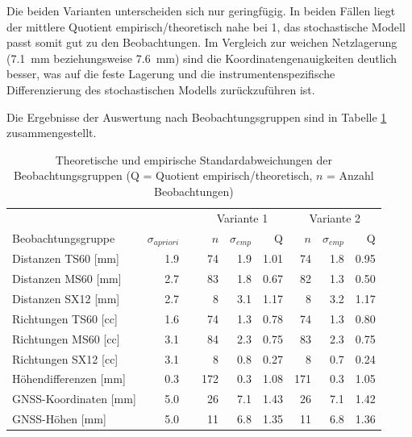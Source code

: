 Die beiden Varianten unterscheiden sich nur geringfügig. In beiden Fällen liegt der mittlere
Quotient empirisch/theoretisch nahe bei 1, das stochastische Modell passt somit gut zu den
Beobachtungen. Im Vergleich zur weichen Netzlagerung
(7.1~mm beziehungsweise 7.6~mm) sind die Koordinatengenauigkeiten deutlich besser, was auf die
feste Lagerung und die instrumentenspezifische Differenzierung des stochastischen Modells
zurückzuführen ist.\bigskip

Die Ergebnisse der Auswertung nach Beobachtungsgruppen sind in Tabelle \ref{tab:beobachtungsgruppen} zusammengestellt.

\begin{table}[H]
    \centering
    \small
    \begin{tabularx}{\textwidth}{p{4.2cm} r r | r r r | r r r}
        \toprule
         & & & \multicolumn{3}{c|}{Variante 1} & \multicolumn{3}{c}{Variante 2} \\
        Beobachtungsgruppe & $\sigma_{apriori}$ & & $n$ & $\sigma_{emp}$ & Q & $n$ & $\sigma_{emp}$ & Q \\
        \midrule
        Distanzen TS60 [mm]  & 1.9 & & 74  & 1.9 & 1.01 & 74  & 1.8 & 0.95 \\
        Distanzen MS60 [mm]  & 2.7 & & 83  & 1.8 & 0.67 & 82  & 1.3 & 0.50 \\
        Distanzen SX12 [mm]  & 2.7 & & 8   & 3.1 & 1.17 & 8   & 3.2 & 1.17 \\
        \addlinespace
        Richtungen TS60 [cc] & 1.6 & & 74  & 1.3 & 0.78 & 74  & 1.3 & 0.80 \\
        Richtungen MS60 [cc] & 3.1 & & 84  & 2.3 & 0.75 & 83  & 2.3 & 0.75 \\
        Richtungen SX12 [cc] & 3.1 & & 8   & 0.8 & 0.27 & 8   & 0.7 & 0.24 \\
        \addlinespace
        Höhendifferenzen [mm] & 0.3 & & 172 & 0.3 & 1.08 & 171 & 0.3 & 1.05 \\
        GNSS-Koordinaten [mm] & 5.0 & & 26  & 7.1 & 1.43 & 26  & 7.1 & 1.42 \\
        GNSS-Höhen [mm]       & 5.0 & & 11  & 6.8 & 1.35 & 11  & 6.8 & 1.36 \\
        \bottomrule
    \end{tabularx}
    \caption{Theoretische und empirische Standardabweichungen der Beobachtungsgruppen
    (Q = Quotient empirisch/theoretisch, $n$ = Anzahl Beobachtungen)}
    \label{tab:beobachtungsgruppen}
\end{table}

